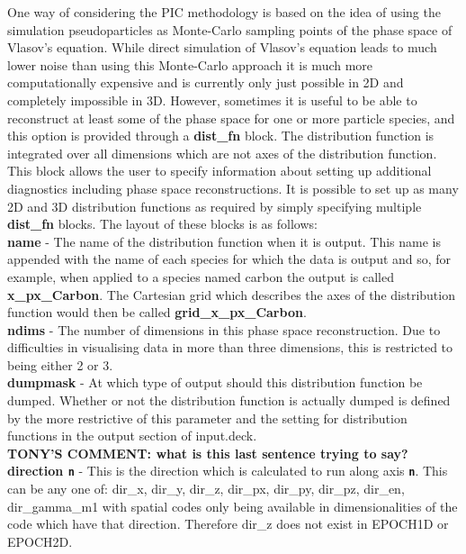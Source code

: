 \documentclass[12pt,a4paper]{article}
\newcommand{\emphtext}{\color{warwickdark} \fontfamily{phv}\selectfont\large\bf}
\newcommand{\inlinecode}[1]{{\color{warwickred} \bf\texttt{#1}}}
\newcommand{\inlineemph}[1]{{\color{warwicklight} \bf{#1}}}
\newcommand{\tony}[1]{{\color{warwickred} \bf{TONY'S COMMENT:} \bf{#1}}\\}
\begin{document}
One way of considering the PIC methodology is based on the idea of using the
simulation pseudoparticles as Monte-Carlo sampling points of the phase space
of Vlasov's equation. While direct simulation of Vlasov's equation leads to
much lower noise than using this Monte-Carlo approach it is much more
computationally expensive and is currently only just possible in 2D and
completely impossible in 3D. However, sometimes it is useful to be able to
reconstruct at least some of the phase space for one or more particle species,
and this option is provided through a \inlineemph{dist\_fn} block. The
distribution function is integrated over all dimensions which are not axes of
the distribution function.\\

This block allows the user to specify information about
setting up additional diagnostics including phase space reconstructions. It is
possible to set up as many 2D and 3D distribution functions as required by
simply specifying multiple \inlineemph{dist\_fn} blocks. The layout of these
blocks is as follows:\\

{\emphtext name} - The name of the distribution function when it is
output. This name is appended with the name of each species for which the data
is output and so, for example, when applied to a species named
carbon the output is called \inlineemph{x\_px\_Carbon}. The Cartesian grid
which describes the axes of the distribution function would then be called
\inlineemph{grid\_x\_px\_Carbon}.\\

{\emphtext ndims} - The number of dimensions in this phase space
reconstruction. Due to difficulties in visualising data in more than three
dimensions, this is restricted to being either 2 or 3.\\

{\emphtext dumpmask} - At which type of output should this distribution
function be dumped. Whether or not the distribution function is actually
dumped is defined by the more restrictive of this parameter and the setting for
distribution functions in the output section of input.deck.\\
\tony{what is this last sentence trying to say?}

{\emphtext direction\inlinecode{n}} - This is the direction
which is calculated to run along axis \inlinecode{n}. This can be any one of:
dir\_x, dir\_y, dir\_z, dir\_px, dir\_py, dir\_pz, dir\_en, dir\_gamma\_m1
with spatial codes only being available in dimensionalities of the code which
have that direction. Therefore dir\_z does not exist in EPOCH1D or EPOCH2D.\\
\end{document}
